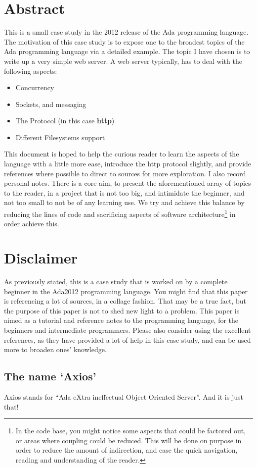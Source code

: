 \section{Abstract} 
This is a small case study in the 2012 release of the Ada programming language. The motivation of this case study is to expose one to the broadest topics of the Ada programming language via a detailed example. The topic I have chosen is to write up a very simple web server. A web server typically, has to deal with the following aspects:
\begin{itemize}
\item Concurrency
\item Sockets, and messaging
\item The Protocol (in this case \textbf{http})
\item Different Filesystems support
\end{itemize} 
This document is hoped to help the curious reader to learn the aspects of the language with a little more ease, introduce the http protocol slightly, and provide references where possible to direct to sources for more exploration. I also record personal notes. 
There is a core aim, to present the aforementioned array of topics to the reader, in a project that is not too big, and intimidate the beginner, and not too small to not be of any learning use. We try and achieve this balance by reducing the lines of code and sacrificing aspects of software architecture\footnote{In the code base, you might notice some aspects that could be factored out, or areas where coupling could be reduced. This will be done on purpose in order to reduce the amount of indirection, and ease the quick navigation, reading and understanding of the reader.} in order achieve this.

\section{Disclaimer}
As previously stated, this is a case study that is worked on by a complete beginner in the Ada2012 programming language. You might find that this paper is referencing a lot of sources, in a collage fashion. That may be a true fact, but the purpose of this paper is not to shed new light to a problem. This paper is aimed as a tutorial and reference notes to the programming language, for the beginners and intermediate programmers. Please also consider using the excellent references, as they have provided a lot of help in this case study, and can be used more to broaden ones' knowledge.

\subsection{The name `Axios'}
Axios stands for ``Ada eXtra ineffectual Object Oriented Server''. And it is just that!

